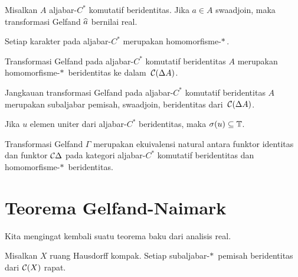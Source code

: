 \begin{cor}\label{001406} Misalkan $A$ aljabar-$C^*$ komutatif beridentitas. Jika $a \in A$ swaadjoin,
maka transformasi Gelfand $\widehat{a}$ bernilai real.
\end{cor}

\begin{cor}\label{0014062} Setiap karakter pada aljabar-$C^*$ merupakan homomorfisme-$*\,$.
\end{cor}

\begin{cor}\label{0014062fa} Transformasi Gelfand pada aljabar-$C^*$ komutatif beridentitas $A$ merupakan
homomorfisme-$*\,$ beridentitas ke dalam~$\mathcal{C}(\Delta A)$.
\end{cor}

\begin{cor} Jangkauan transformasi Gelfand pada aljabar-$C^*$ komutatif beridentitas $A$ merupakan
subaljabar pemisah, swaadjoin, beridentitas dari~$\mathcal{C}(\Delta A)$.
\end{cor}

\begin{prop}\label{001313} Jika $u$ elemen uniter dari aljabar-$C^*$ beridentitas,
maka $\sigma(u) \subseteq \mathbb{T}$.
\end{prop}

\begin{prop} Transformasi Gelfand $\Gamma$ merupakan ekuivalensi natural antara funktor identitas
dan funktor $\mathcal{C}\Delta$ pada kategori aljabar-$C^*$ komutatif beridentitas dan homomorfisme-$*\,$
beridentitas.
\end{prop}













\section{Teorema Gelfand-Naimark}

Kita mengingat kembali suatu teorema baku dari analisis real.

\begin{thm}\label{00141} Misalkan $X$ ruang Hausdorff kompak. Setiap
subaljabar-$*\,$ pemisah beridentitas dari $\mathcal{C}(X)$ rapat.
\end{thm}


